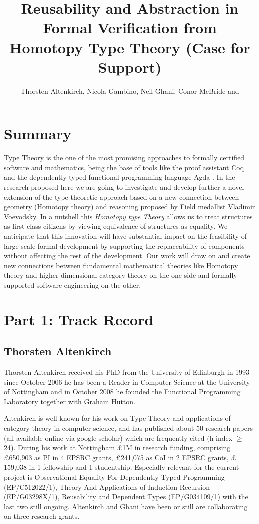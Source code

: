 \documentclass[twocolumn,a4paper,11pt]{article}
\title{Reusability and Abstraction in Formal Verification from Homotopy Type Theory
\LARGE (Case for Support)}
\author{Thorsten Altenkirch, Nicola Gambino, Neil Ghani, Conor McBride and {\Ondrej} {\Rypacek}}
\date{}
\begin{document}
\raggedright
\sffamily

\maketitle
\section*{Summary}
Type Theory is the one of the most promising approaches to formally
certified software and mathematics, being the base of tools like the
proof assistant Coq \cite{CoqArt} and the dependently typed functional
programming language Agda \cite{Agda}. In the research proposed here
we are going to investigate and develop further a novel extension of
the type-theoretic approach based on a new connection between geometry
(Homotopy theory) and reasoning proposed by Field medallist Vladimir
Voevodsky. In a nutshell this \emph{Homotopy type Theory}
allows us to treat structures as first class citizens by viewing
equivalence of structures as equality. We anticipate that this
innovation will have substantial impact on the feasibility of large scale
formal development by supporting the replaceability of components
without affecting the rest of the development. Our work will draw on
and create new connections between fundamental mathematical theories
like Homotopy theory and higher dimensional category theory on the one
side and formally supported software engineering on the other.


\section*{Part 1: Track Record}

\subsection*{Thorsten Altenkirch}
Thorsten Altenkirch received his PhD from the University of
Edinburgh in 1993 since October 2006 he has been a Reader in
Computer Science at the University of Nottingham and in October
2008 he founded  the Functional Programming Laboratory together with
Graham Hutton.

Altenkirch is well known for his work on Type Theory and applications
of category theory in computer science, and has published about 50
research papers (all available online via google scholar) which are
frequently cited (h-index $\geq$ 24). During his work at Nottingham
\pounds 1M in research funding, comprising \pounds 650,903 as PI in 4
EPSRC grants, \pounds 241,075 as CoI in 2 EPSRC grants, \pounds
159,038 in 1 fellowship and 1 studentship. Especially relevant for the
current project is Observational Equality For Dependently Typed Programming
(EP/C512022/1), Theory And Applications of Induction Recursion (EP/G03298X/1),
Reusability and Dependent Types (EP/G034109/1) with the last two still
ongoing. Altenkirch and Ghani have been or still are collaborating on
three research grants.
\end{document}
